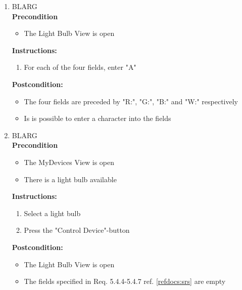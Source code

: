 \documentclass[a4paper]{article}
\newlength{\testlabellength}
\newenvironment{testlist}{\begin{enumerate}[label=\bfseries Instruction \thesubsection.\arabic* , labelindent=0pt, labelwidth=\testlabellength , leftmargin=2cm]}{\end{enumerate}}
\newenvironment{precondition}{
{\color{white}BLARG}\\ 
\textbf{Precondition}
\begin{itemize}[labelindent=0cm, labelwidth=2cm , leftmargin=1cm]
}
{\end{itemize}}
\newenvironment{instruction}{
\textbf{Instructions:}
\begin{enumerate}[label=\bfseries  \arabic*., labelindent=0cm, labelwidth=2cm , leftmargin=1cm]
}
{\end{enumerate}}
\newenvironment{postcondition}{
\textbf{Postcondition:}
\begin{itemize}[labelindent=0cm, labelwidth=2cm , leftmargin=1cm]
}
{\end{itemize}}
\begin{document}
\begin{appendices}
\begin{testlist}
   
   	\item
   		\begin{precondition}
   			\item The Light Bulb View is open
		\end{precondition}
    	\begin{instruction}
    		\item For each of the four fields, enter "A"
    	\end{instruction}
    	\begin{postcondition}
    		\item The four fields are preceded by "R:", "G:", "B:" and "W:" respectively
    		\item Is is possible to enter a character into the fields
    	\end{postcondition}


	\item
		\begin{precondition}
			\item The MyDevices View is open
			\item There is a light bulb available
		\end{precondition}
		\begin{instruction}
			\item Select a light bulb
			\item Press the "Control Device"-button
		\end{instruction}
		\begin{postcondition}
			\item The Light Bulb View is open
			\item The fields specified in Req. 5.4.4-5.4.7 ref. \ref{refdocs:srs} are empty
		\end{postcondition}	   


\end{testlist}
\end{appendices}
\end{document}
